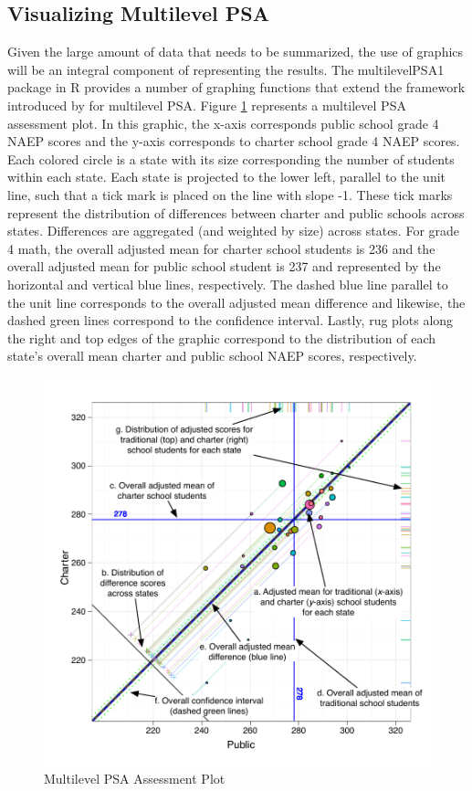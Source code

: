 \documentclass[man,floatsintext]{apa6}
\begin{document}
\subsection{Visualizing Multilevel PSA}

Given the large amount of data that needs to be summarized, the use of graphics will be an integral component of representing the results. The multilevelPSA1 package in R provides a number of graphing functions that extend the framework introduced by \textcite{HelmreichPruzek2009} for multilevel PSA. Figure \ref{fig:g8math:circ} represents a multilevel PSA assessment plot. In this graphic, the x-axis corresponds public school grade 4 NAEP scores and the y-axis corresponds to charter school grade 4 NAEP scores. Each colored circle is a state with its size corresponding the number of students within each state. Each state is projected to the lower left, parallel to the unit line, such that a tick mark is placed on the line with slope -1. These tick marks represent the distribution of differences between charter and public schools across states. Differences are aggregated (and weighted by size) across states. For grade 4 math, the overall adjusted mean for charter school students is 236 and the overall adjusted mean for public school student is 237 and represented by the horizontal and vertical blue lines, respectively. The dashed blue line parallel to the unit line corresponds to the overall adjusted mean difference and likewise, the dashed green lines correspond to the confidence interval. Lastly, rug plots along the right and top edges of the graphic correspond to the distribution of each state's overall mean charter and public school NAEP scores, respectively.

\begin{figure}[tp]
\begin{center}
\includegraphics[width=\textwidth]{../Figures/AnnotatedCircPlot.pdf}
\caption{Multilevel PSA Assessment Plot}
\label{fig:g8math:circ}
\end{center}
\end{figure}
\end{document}
